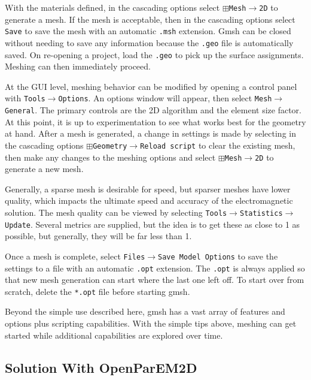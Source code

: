 \documentclass[titlepage]{article}
\renewcommand\_{\textunderscore\linebreak[1]}
\begin{document}
With the materials defined, in the cascading options select $\boxplus$\texttt{Mesh}$\rightarrow$\texttt{2D} to generate a mesh.  If the mesh is acceptable, then in the cascading options select \texttt{Save} to save the mesh with an automatic \texttt{.msh} extension.  Gmsh can be closed without needing to save any information because the \texttt{.geo} file is automatically saved.
On re-opening a project, load the \texttt{.geo} to pick up the surface assignments.  Meshing can then immediately proceed.

At the GUI level, meshing behavior can be modified by opening a control panel with \texttt{Tools}$\rightarrow$\texttt{Options}.  An options window will appear, then select \texttt{Mesh}$\rightarrow$\texttt{General}.  The primary controls are the 2D algorithm and the element size factor.  At this point, it is up to experimentation to see what works best for the geometry at hand.  After a mesh is generated, a change in settings is made by selecting in the cascading options $\boxplus$\texttt{Geometry}$\rightarrow$\texttt{Reload script} to clear the existing mesh, then make any changes to the meshing options and select $\boxplus$\texttt{Mesh}$\rightarrow$\texttt{2D} to generate a new mesh.

Generally, a sparse mesh is desirable for speed, but sparser meshes have lower quality, which impacts the ultimate speed and accuracy of the electromagnetic solution.  The mesh quality can be viewed by selecting \texttt{Tools}$\rightarrow$\texttt{Statistics}$\rightarrow$\texttt{Update}.  Several metrics are supplied, but the idea is to get these as close to 1 as possible, but generally, they will be far less than 1. 

Once a mesh is complete, select  \texttt{Files}$\rightarrow$\texttt{Save Model Options} to save the settings to a file with an automatic \texttt{.opt} extension.  The \texttt{.opt} is always applied so that new mesh generation can start where the last one left off.  To start over from scratch, delete the \texttt{*.opt} file before starting gmsh.

Beyond the simple use described here, gmsh has a vast array of features and options plus scripting capabilities. With the simple tips above, meshing can get started while additional capabilities are explored over time.

\subsection{Solution With OpenParEM2D}
\label{sec:solution}
\end{document}
